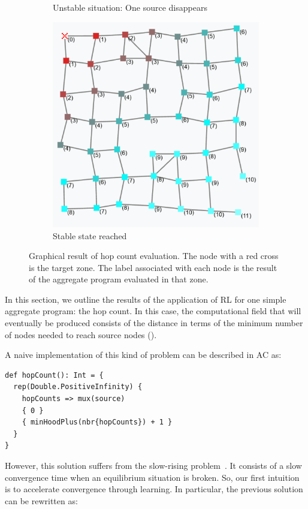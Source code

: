 \documentclass[conference]{IEEEtran}
\begin{document}
\begin{figure}[h]
\begin{subfigure}[b]{0.32\textwidth}
      \caption{Unstable situation: One source disappears}
  \end{subfigure}
  \hfill
  \begin{subfigure}[b]{0.32\textwidth}
      \centering
      \includegraphics[width=\textwidth]{img/hop-count-3.png}
      \caption{Stable state reached}
  \end{subfigure}
  \caption{Graphical result of hop count evaluation. The node with a red cross is the target zone. The label 
  associated with each node is the result of the aggregate program evaluated in that zone.}
  \label{fig:hop-count}
\end{figure}
In this section, we outline the results of the application of RL for one simple
 aggregate program: the hop count. In this case, the computational field that will eventually be produced consists of the distance in terms of the minimum number of nodes needed to reach source nodes ().

A naive implementation of this kind of problem can be described in AC as:
\begin{verbatim}
def hopCount(): Int = {
  rep(Double.PositiveInfinity) { 
    hopCounts => mux(source) 
    { 0 } 
    { minHoodPlus(nbr{hopCounts}) + 1 }
  }
}
\end{verbatim}
However, this solution suffers from the slow-rising problem~\cite{DBLP:conf/saso/AudritoCDV17}. 
 It consists of a slow convergence time when an equilibrium situation is broken.
So, our first intuition is to accelerate convergence through learning.
 In particular, the previous solution can be rewritten as:
\end{document}
